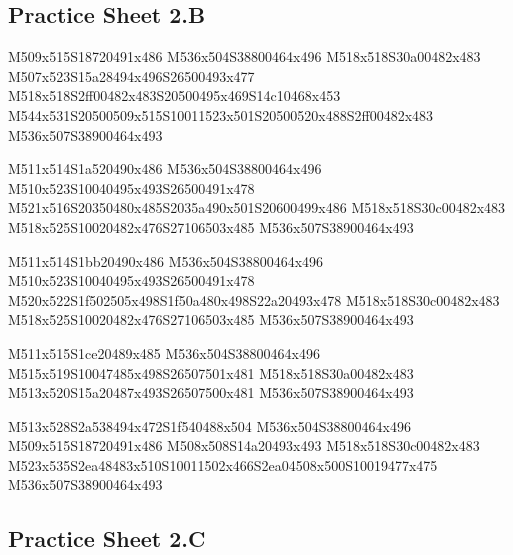 \documentclass{article}
\begin{document}
\subsection{Practice Sheet 2.B}

\begin{multicols}{5}
\begin{center}
M509x515S18720491x486 %
M536x504S38800464x496 %
M518x518S30a00482x483 %
M507x523S15a28494x496S26500493x477 %
M518x518S2ff00482x483S20500495x469S14c10468x453 %
M544x531S20500509x515S10011523x501S20500520x488S2ff00482x483 %
M536x507S38900464x493 %
\vfil
\columnbreak

M511x514S1a520490x486 %
M536x504S38800464x496 %
M510x523S10040495x493S26500491x478 %
M521x516S20350480x485S2035a490x501S20600499x486 %
M518x518S30c00482x483 %
M518x525S10020482x476S27106503x485 %
M536x507S38900464x493 %
\vfil
\columnbreak

M511x514S1bb20490x486 %
M536x504S38800464x496 %
M510x523S10040495x493S26500491x478 %
M520x522S1f502505x498S1f50a480x498S22a20493x478 %
M518x518S30c00482x483 %
M518x525S10020482x476S27106503x485 %
M536x507S38900464x493 %
\vfil
\columnbreak

M511x515S1ce20489x485 %
M536x504S38800464x496 %
M515x519S10047485x498S26507501x481 %
M518x518S30a00482x483 %
M513x520S15a20487x493S26507500x481 %
M536x507S38900464x493 %
\vfil
\columnbreak

M513x528S2a538494x472S1f540488x504 %
M536x504S38800464x496 %
M509x515S18720491x486 %
M508x508S14a20493x493 %
M518x518S30c00482x483 %
M523x535S2ea48483x510S10011502x466S2ea04508x500S10019477x475 %
M536x507S38900464x493 %
\vfil

\end{center}
\end{multicols}

\subsection{Practice Sheet 2.C}
\end{document}

